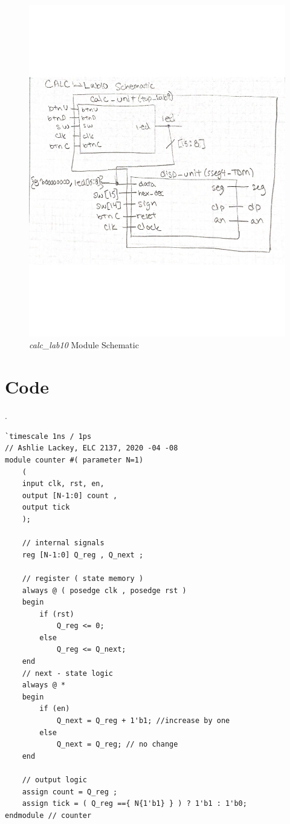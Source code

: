 \documentclass[11pt]{article}
\begin{document}
\begin{figure}[ht]\centering
	\includegraphics[width=1\textwidth]{calc10_sch}
	\caption{\textit{calc\_lab10} Module Schematic}
	\label{fig:sim_with_table}
\end{figure}

\clearpage

\section*{Code}
.

\begin{lstlisting}[style=Verilog,caption=Counter Verilog Code,label=code:ex ]
`timescale 1ns / 1ps
// Ashlie Lackey, ELC 2137, 2020 -04 -08
module counter #( parameter N=1)
	(
	input clk, rst, en,
	output [N-1:0] count ,
	output tick
	);
	
	// internal signals
	reg [N-1:0] Q_reg , Q_next ;
	
	// register ( state memory )
	always @ ( posedge clk , posedge rst )
	begin
		if (rst)
			Q_reg <= 0;
		else
			Q_reg <= Q_next;
	end
	// next - state logic
	always @ *
	begin
		if (en)
			Q_next = Q_reg + 1'b1; //increase by one
		else
			Q_next = Q_reg; // no change
	end
	
	// output logic
	assign count = Q_reg ;
	assign tick = ( Q_reg =={ N{1'b1} } ) ? 1'b1 : 1'b0;
endmodule // counter
\end{lstlisting}
\end{document}

